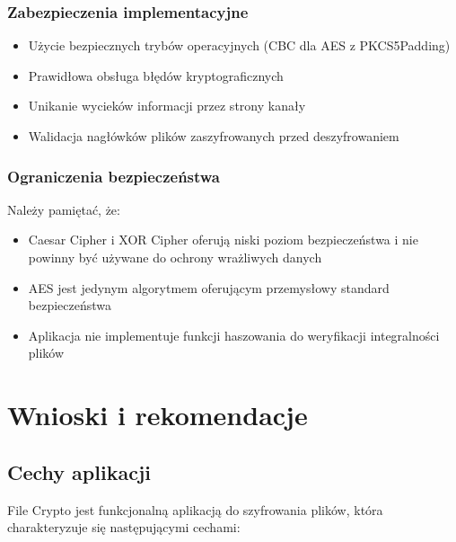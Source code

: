 \documentclass[12pt,a4paper]{article}
\begin{document}
\subsubsection{Zabezpieczenia implementacyjne}

\begin{itemize}
\item Użycie bezpiecznych trybów operacyjnych (CBC dla AES z PKCS5Padding)
\item Prawidłowa obsługa błędów kryptograficznych
\item Unikanie wycieków informacji przez strony kanały
\item Walidacja nagłówków plików zaszyfrowanych przed deszyfrowaniem
\end{itemize}

\subsubsection{Ograniczenia bezpieczeństwa}

Należy pamiętać, że:

\begin{itemize}
\item Caesar Cipher i XOR Cipher oferują niski poziom bezpieczeństwa i nie powinny być używane do ochrony wrażliwych danych
\item AES jest jedynym algorytmem oferującym przemysłowy standard bezpieczeństwa
\item Aplikacja nie implementuje funkcji haszowania do weryfikacji integralności plików
\end{itemize}

\section{Wnioski i rekomendacje}

\subsection{Cechy aplikacji}

File Crypto jest funkcjonalną aplikacją do szyfrowania plików, która charakteryzuje się następującymi cechami:
\end{document}
